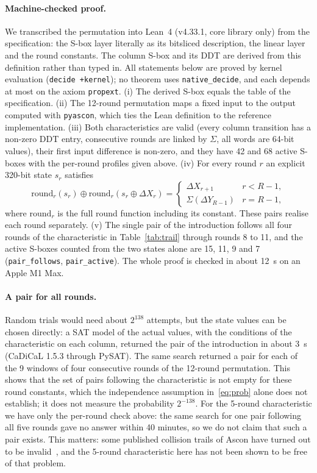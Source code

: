 \documentclass[11pt,a4paper]{article}
\begin{document}
\paragraph{Machine-checked proof.} We transcribed the permutation into Lean~4 (v4.33.1, core
library only) from the specification: the S-box layer literally as its bitsliced description, the
linear layer and the round constants. The column S-box and its DDT are derived from this definition
rather than typed in. All statements below are proved by kernel evaluation (\texttt{decide +kernel});
no theorem uses \texttt{native\_decide}, and each depends at most on the axiom \texttt{propext}.
(i) The derived S-box equals the table of the specification.
(ii) The 12-round permutation maps a fixed input to the output computed with \texttt{pyascon}, which
ties the Lean definition to the reference implementation.
(iii) Both characteristics are valid (every column transition has a non-zero DDT entry, consecutive
rounds are linked by $\Sigma$, all words are 64-bit values), their first input difference is non-zero,
and they have 42 and 68 active S-boxes with the per-round profiles given above.
(iv) For every round $r$ an explicit 320-bit state $s_r$ satisfies
\begin{equation}\label{eq:witness}
\mathrm{round}_r(s_r)\oplus\mathrm{round}_r(s_r\oplus\Delta X_r)=
\begin{cases}\Delta X_{r+1} & r<R-1,\\ \Sigma(\Delta Y_{R-1}) & r=R-1,\end{cases}
\end{equation}
where $\mathrm{round}_r$ is the full round function including its constant. These
pairs realise each round separately.
(v) The single pair of the introduction follows all four rounds of the characteristic in
Table~\ref{tab:trail} through rounds 8 to 11, and the active S-boxes counted from the two states alone are
15, 11, 9 and 7 (\texttt{pair\_follows}, \texttt{pair\_active}).
The whole proof is checked in about 12~s on an Apple M1 Max.

\paragraph{A pair for all rounds.} Random trials would need about $2^{138}$ attempts, but the state
values can be chosen directly: a SAT model of the actual values, with the conditions of the characteristic on each
column, returned the pair of the introduction in about 3~s (CaDiCaL 1.5.3 through PySAT). The same search returned a pair for each of the 9
windows of four consecutive rounds of the 12-round permutation. This shows that the set of pairs following the characteristic is not empty for these
round constants, which the independence assumption in~\eqref{eq:prob} alone does not establish; it does not measure the probability $2^{-138}$.
For the 5-round characteristic we have only the per-round check above: the same search for one pair following all five rounds gave no answer within 40 minutes, so we do not claim that such a pair exists. This matters: some published collision trails of Ascon have turned out to be invalid~\cite{LLLQS25}, and the 5-round characteristic here has not been shown to be free of that problem.
\end{document}
